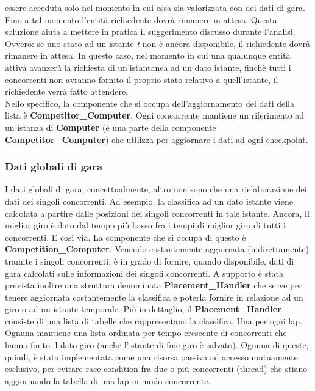      essere acceduta solo nel momento in cui essa sia valorizzata con dei dati
di gara. Fino a tal momento l'entità richiedente dovrà rimanere
     in attesa. Questa soluzione aiuta a mettere in pratica il suggerimento
discusso durante l'analisi. Ovvero: se uno stato ad un istante
     \emph{t} non è ancora disponibile, il richiedente dovrà rimanere in attesa.
In questo caso, nel momento in cui una qualunque entità attiva
     avanzerà la richiesta di un'istantanea ad un dato istante, finchè tutti i
concorrenti non avranno fornito il proprio stato relativo 
     a quell'istante, il richiedente verrà fatto attendere.\\
     Nello specifico, la componente che si occupa dell'aggiornamento dei dati
della lista è \textbf{Competitor\_Computer}. Ogni concorrente
     mantiene un riferimento ad un istanza di \textbf{Computer} (è una parte
della componente \textbf{Competitor\_Computer}) 
     che utilizza per aggiornare i dati ad ogni checkpoint.
     \subsubsection{Dati globali di gara}
     \label{dati_globali}
     I dati globali di gara, concettualmente, altro non sono che una
rielaborazione dei dati dei singoli concorrenti. Ad esempio, la classifica
     ad un dato istante viene calcolata a partire dalle posizioni dei singoli
concorrenti in tale istante. Ancora, il miglior giro è dato dal
     tempo più basso fra i tempi di miglior giro di tutti i concorrenti. E così
via. La componente che si occupa di questo è \textbf{Competition\_Computer}.
     Venendo costantemente aggiornata (indirettamente) tramite i singoli
concorrenti, è in grado di fornire, quando disponibile, dati di gara
     calcolati sulle informazioni dei singoli concorrenti. A supporto è stata
prevista inoltre una struttura denominata \textbf{Placement\_Handler}
     che serve per tenere aggiornata costantemente la classifica e poterla
fornire in relazione ad un giro o ad un istante temporale.
     Più in dettaglio, il \textbf{Placement\_Handler} consiste di una lista di
tabelle che rappresentano la classifica. Una per ogni lap.
     Ognuna mantiene una lista ordinata per tempo crescente di concorrenti che
hanno finito il dato giro (anche l'istante di fine giro è
     salvato).
     Ognuna di queste, quindi, è stata implementata come una risorsa passiva ad
accesso mutuamente esclusivo, 
     per evitare race condition fra due o più concorrenti (thread) che stiano
aggiornando la tabella di una lap in modo concorrente.
